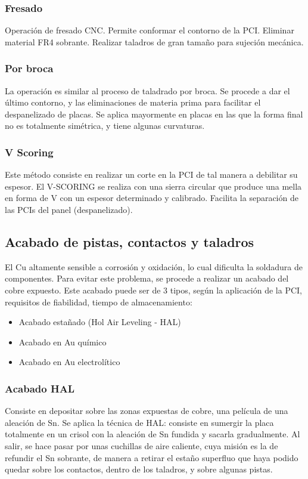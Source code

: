 \subsubsection{Fresado}
Operación de fresado CNC. Permite conformar el contorno de la PCI. Eliminar material FR4 sobrante. Realizar taladros de gran tamaño para sujeción mecánica.

\subsubsection{Por broca}
La operación es similar al proceso de taladrado por broca. Se procede a dar el último contorno, y las eliminaciones de materia prima para facilitar el despanelizado de placas. Se aplica mayormente en placas en las que la forma final no es totalmente simétrica, y tiene algunas curvaturas.

\subsubsection{V Scoring}
Este método consiste en realizar un corte en la PCI de tal manera a debilitar su espesor. El V-SCORING se realiza con una sierra circular que produce una mella en forma de V con un espesor determinado y calibrado. Facilita la separación de las PCIs del panel (despanelizado).

\subsection{Acabado de pistas, contactos y taladros}
El Cu altamente sensible a corrosión y oxidación, lo cual dificulta la soldadura de componentes. Para evitar este problema, se procede a realizar un acabado del cobre expuesto. Este acabado puede ser de 3 tipos, según la aplicación de la PCI, requisitos de fiabilidad, tiempo de almacenamiento:
\begin{itemize}
    \item Acabado estañado (Hol Air Leveling - HAL)
    \item Acabado en Au químico
    \item Acabado en Au electrolítico
\end{itemize}

\subsubsection{Acabado HAL}
Consiste en depositar sobre las zonas expuestas de cobre, una película de una aleación de Sn. Se aplica la técnica de HAL: consiste en sumergir la placa totalmente en un crisol con la aleación de Sn fundida y sacarla gradualmente. Al salir, se hace pasar por unas cuchillas de aire caliente, cuya misión es la de refundir el Sn sobrante, de manera a retirar el estaño superfluo que haya podido quedar sobre los contactos, dentro de los taladros, y sobre algunas pistas.

